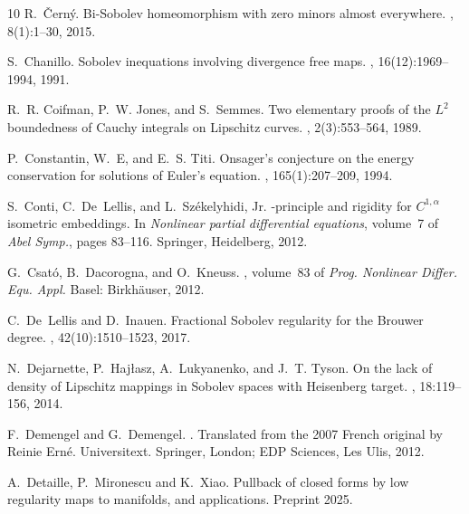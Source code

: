 \documentclass[intlimits,12pt,reqno]{amsart}
\numberwithin{equation}{section}
\theoremstyle{definition}
\begin{document}
\begin{thebibliography}{10}
R.~\v{C}ern\'{y}.
\newblock Bi-{S}obolev homeomorphism with zero minors almost everywhere.
, 8(1):1--30, 2015.


S.~Chanillo.
\newblock Sobolev inequations involving divergence free maps.
,
  16(12):1969--1994, 1991.

R.~R. Coifman, P.~W. Jones, and S.~Semmes.
\newblock Two elementary proofs of the $L^2$ boundedness of Cauchy integrals on Lipschitz curves.
, 2(3):553--564,
  1989.

P.~Constantin, W.~E, and E.~S. Titi.
\newblock Onsager's conjecture on the energy conservation for solutions of
  {E}uler's equation.
, 165(1):207--209, 1994.

S.~Conti, C.~De~Lellis, and L.~Sz\'{e}kelyhidi, Jr.
-principle and rigidity for {$C^{1,\alpha}$} isometric
  embeddings.
\newblock In {\em Nonlinear partial differential equations}, volume~7 of {\em
  Abel Symp.}, pages 83--116. Springer, Heidelberg, 2012.

G.~Csat{\'o}, B.~Dacorogna, and O.~Kneuss.
, volume~83 of {\em
  Prog. Nonlinear Differ. Equ. Appl.}
\newblock Basel: Birkh{\"a}user, 2012.

C.~De~Lellis and D.~Inauen.
\newblock Fractional {S}obolev regularity for the {B}rouwer degree.
, 42(10):1510--1523, 2017.

N.~Dejarnette, P.~Haj\l{}asz, A.~Lukyanenko, and J.~T. Tyson.
\newblock On the lack of density of {L}ipschitz mappings in {S}obolev spaces
  with {H}eisenberg target.
, 18:119--156, 2014.

F.~Demengel and G.~Demengel.
.
\newblock Translated from the 2007 French original by Reinie Ern\'{e}.
\newblock Universitext. Springer, London; EDP Sciences, Les Ulis, 2012.

A.~Detaille, P.~Mironescu and K.~Xiao.
\newblock Pullback of closed forms by low regularity maps to manifolds,
and applications. 
\newblock Preprint 2025.


\end{thebibliography}
\end{document}
